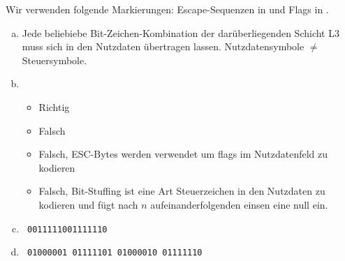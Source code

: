 

\date{Mittwoch 20.11.2019}


\renewcommand{\L}{\text{L}}
\newcommand{\R}{\text{R}}
\newcommand\Ssend{\text{S}_{\text{send}}}
\newcommand{\bits}{\text{ b}}

\renewcommand{\iff}{\Leftrightarrow}


\maketitle
\thispagestyle{fancy}

    
    Wir verwenden folgende Markierungen: Escape-Sequenzen in  und Flags in .
    
    \begin{enumerate}[a)]
        \item 
            Jede beliebiebe Bit-Zeichen-Kombination der darüberliegenden Schicht L3 muss sich in den Nutzdaten übertragen lassen. Nutzdatensymbole $\neq$ Steuersymbole.            
        \item 
            \begin{itemize}
                \item Richtig
                \item Falsch
                \item Falsch, ESC-Bytes werden verwendet um flags im Nutzdatenfeld zu kodieren
                \item Falsch, Bit-Stuffing ist eine Art Steuerzeichen in den Nutzdaten zu kodieren und fügt nach $n$ aufeinanderfolgenden einsen eine null ein.
            \end{itemize}
        \item \texttt{ 0011111001111110 } 
        
        \item \texttt{ 01000001  01111101 01000010  01111110 }
    \end{enumerate}
    

